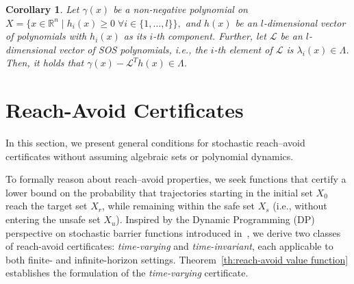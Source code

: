 \documentclass[journal,twoside,web]{ieeecolor}
\newcommand{\set}[1]{\{#1\}}
\newcommand{\algebraic}{X = \big \{ x \in \reals^n \mid h_i(x) \geq 0 \; \forall i \in \set{1, \ldots, l} \big \}}
\newcommand{\reals}{\mathbb{R}}
\renewcommand{\L}{\mathcal{L}}
\theoremstyle{definition}
\theoremstyle{plain}
\newtheorem{corollary}[theorem]{Corollary}
\theoremstyle{plain}
\begin{document}
\begin{corollary}
\label{cor:sosp1}
Let $\gamma(x)$ be a non-negative polynomial on $\algebraic,$ and $h(x)$ be an $l$-dimensional vector of polynomials with $h_i(x)$ as its $i$-th component.
Further, let $\L$ be an $l$-dimensional vector of SOS polynomials, i.e., the $i$-th element of $\L$ is $\lambda_i(x) \in \Lambda$.
Then, it holds that $ \gamma(x) - \mathcal{L}^{T} h(x) \in \Lambda$.
\end{corollary}


\section{Reach-Avoid Certificates}
\label{sec: certificate formulations}


In this section, we present general conditions for stochastic reach–avoid certificates without assuming algebraic sets or polynomial dynamics. 

To formally reason about reach–avoid properties, we seek functions that certify a lower bound on the probability that trajectories starting in the initial set $X_0$ reach the target set $X_r$, while remaining within the safe set $X_s$ (i.e., without entering the unsafe set $X_u$). 
Inspired by the Dynamic Programming (DP) perspective on stochastic barrier functions introduced in~\cite{laurenti2025unifying}, 
we derive two classes of reach-avoid certificates: \emph{time-varying} and \emph{time-invariant}, each applicable to both finite- and infinite-horizon settings.
Theorem~\ref{th:reach-avoid value function} establishes the formulation of the \emph{time-varying} certificate.


\end{document}
